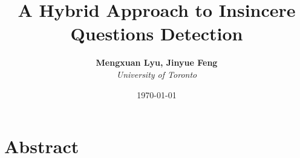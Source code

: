 \documentclass[12pt]{diazessay} %
\title{\textbf{A Hybrid Approach to Insincere Questions Detection}} %
\author{\textbf{Mengxuan Lyu, Jinyue Feng} \\ \textit{University of Toronto}} %
\date{\today} %
\begin{document}
\maketitle %






\doublespacing %

\section{Abstract}
\end{document}
